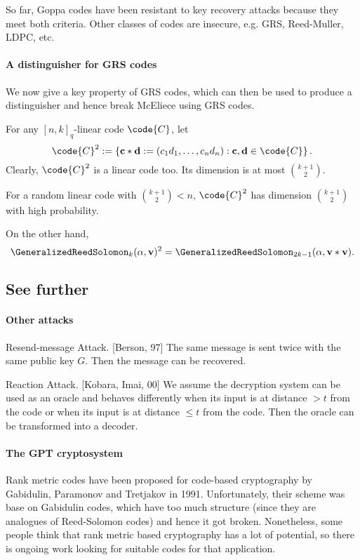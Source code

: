 \documentclass[a4paper, 11pt, openany]{book}
\begin{document}
So far, Goppa codes have been resistant to key recovery attacks because they meet both criteria. Other classes of codes are insecure, e.g. GRS, Reed-Muller, LDPC, etc.


\paragraph{A distinguisher for GRS codes}
We now give a key property of GRS codes, which can then be used to produce a distinguisher and hence break McEliece using GRS codes.

For any $[n,k]_q$-linear code $\code{C}$, let
\[
	\code{C}^2 := \left\{ {\bf c} * {\bf d} := (c_1 d_1, \dots, c_n d_n ) : {\bf c}, {\bf d} \in \code{C} \right\}.
\]
Clearly, $\code{C}^2$ is a linear code too. Its dimension is at most $\binom{k+1}{2}$.

\begin{theorem}
For a random linear code with $\binom{k+1}{2} < n$, $\code{C}^2$ has dimension $\binom{k+1}{2}$ with high probability.

On the other hand,
\[
    \GeneralizedReedSolomon_k({\bf \alpha}, {\bf v} )^2 = \GeneralizedReedSolomon_{2k-1}({\bf \alpha}, {\bf v} * {\bf v}).
\]
\end{theorem}




\subsection{See further}


\paragraph{Other attacks}

Resend-message Attack. [Berson, 97] The same message is sent twice with the same public key $G$. Then the message can be recovered.

Reaction Attack. [Kobara, Imai, 00] We assume the decryption system can be used as an oracle and
behaves differently when  its input is at distance $> t$ from the code or when its input is at distance $\le t$ from the code. Then the oracle can be transformed into a decoder.


\paragraph{The GPT cryptosystem}
Rank metric codes have been proposed for code-based cryptography by Gabidulin, Paramonov and Tretjakov in 1991. Unfortunately, their scheme was base on Gabidulin codes, which have too much structure (since they are analogues of Reed-Solomon codes) and hence it got broken. Nonetheless, some people think that rank metric based cryptography has a lot of potential, so there is ongoing work looking for suitable codes for that application.
\end{document}
